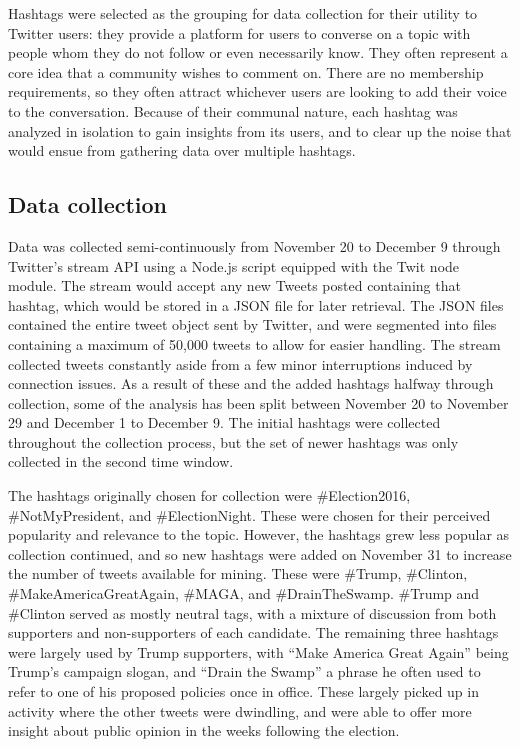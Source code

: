\documentclass[prodmode]{acmsmall} %
\begin{document}
Hashtags were selected as the grouping for data collection for their utility to
Twitter users: they provide a platform for users to converse on a topic with
people whom they do not follow or even necessarily know. They often represent a
core idea that a community wishes to comment on. There are no membership
requirements, so they often attract whichever users are looking to add their
voice to the conversation. Because of their communal nature, each hashtag was
analyzed in isolation to gain insights from its users, and to clear up the noise
that would ensue from gathering data over multiple hashtags.

\subsection{Data collection}
Data was collected semi-continuously from November 20 to December 9 through
Twitter's stream API using a Node.js script equipped with the Twit node module.
The stream would accept any new Tweets posted containing that hashtag, which
would be stored in a JSON file for later retrieval. The JSON files contained the
entire tweet object sent by Twitter, and were segmented into files containing a
maximum of 50,000 tweets to allow for easier handling. The stream collected
tweets constantly aside from a few minor interruptions induced by connection
issues. As a result of these and the added hashtags halfway through collection,
some of the analysis has been split between November 20 to November 29 and
December 1 to December 9. The initial hashtags were collected throughout the
collection process, but the set of newer hashtags was only collected in the
second time window.

The hashtags originally chosen for collection were \#Election2016,
\#NotMyPresident, and \#ElectionNight. These were
chosen for their perceived popularity and relevance to the topic. However, the
hashtags grew less popular as collection continued, and so new hashtags were
added on November 31 to increase the number of tweets available for mining. These
were \#Trump, \#Clinton, \#MakeAmericaGreatAgain, \#MAGA, and \#DrainTheSwamp.
\#Trump and \#Clinton served as mostly neutral tags, with a mixture of
discussion from both supporters and non-supporters of each candidate. The
remaining three hashtags were largely used by Trump supporters, with ``Make
America Great Again'' being Trump's campaign slogan, and ``Drain the Swamp'' a
phrase he often used to refer to one of his proposed policies once in office.
These largely picked up in activity where the other tweets were dwindling, and
were able to offer more insight about public opinion in the weeks following the
election.
\end{document}
